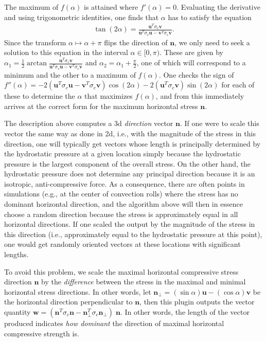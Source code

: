 \begin{itemize}
The maximum of $f(\alpha)$ is attained where $f'(\alpha)=0$. Evaluating the derivative and using trigonometric identities, one finds that $\alpha$ has to satisfy the equation \begin{align*}  \tan(2\alpha) = \frac{\mathbf u^T \sigma_c \mathbf v}                          {\mathbf u^T \sigma_c \mathbf u                            - \mathbf v^T \sigma_c \mathbf v}.\end{align*}Since the transform $\alpha\mapsto\alpha+\pi$ flips the direction of $\mathbf n$, we only need to seek a solution to this equation in the interval $\alpha\in[0,\pi)$. These are given by $\alpha_1=\frac 12 \arctan \frac{\mathbf u^T \sigma_c \mathbf v}{\mathbf u^T \sigma_c \mathbf u - \mathbf v^T \sigma_c \mathbf v}$ and $\alpha_2=\alpha_1+\frac{\pi}{2}$, one of which will correspond to a minimum and the other to a maximum of $f(\alpha)$. One checks the sign of $f''(\alpha)=-2(\mathbf u^T \sigma_c \mathbf u - \mathbf v^T \sigma_c \mathbf v)\cos(2\alpha) - 2 (\mathbf u^T \sigma_c \mathbf v) \sin(2\alpha)$ for each of these to determine the $\alpha$ that maximizes $f(\alpha)$, and from this immediately arrives at the correct form for the maximum horizontal stress $\mathbf n$.

The description above computes a 3d \textit{direction} vector $\mathbf n$. If one were to scale this vector the same way as done in 2d, i.e., with the magnitude of the stress in this direction, one will typically get vectors whose length is principally determined by the hydrostatic pressure at a given location simply because the hydrostatic pressure is the largest component of the overall stress. On the other hand, the hydrostatic pressure does not determine any principal direction because it is an isotropic, anti-compressive force. As a consequence, there are often points in simulations (e.g., at the center of convection rolls) where the stress has no dominant horizontal direction, and the algorithm above will then in essence choose a random direction because the stress is approximately equal in all horizontal directions. If one scaled the output by the magnitude of the stress in this direction (i.e., approximately equal to the hydrostatic pressure at this point), one would get randomly oriented vectors at these locations with significant lengths.

To avoid this problem, we scale the maximal horizontal compressive stress direction $\mathbf n$ by the \textit{difference} between the stress in the maximal and minimal horizontal stress directions. In other words, let $\mathbf n_\perp=(\sin \alpha)\mathbf u - (\cos\alpha)\mathbf v$ be the horizontal direction perpendicular to $\mathbf n$, then this plugin outputs the vector quantity $\mathbf w = (\mathbf n^T \sigma_c \mathbf n                -\mathbf n^T_\perp \sigma_c \mathbf n_\perp)               \; \mathbf n$. In other words, the length of the vector produced indicates \textit{how dominant} the direction of maximal horizontal compressive strength is.


\end{itemize}
